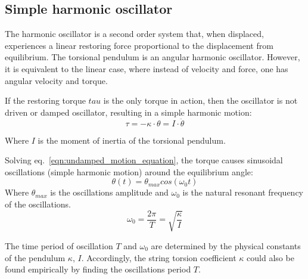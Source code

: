 \documentclass[\main/master.tex]{subfiles}
\begin{document}
\subsection{Simple harmonic oscillator}
The harmonic oscillator is a second order system that, when displaced, experiences a linear restoring force proportional to the displacement from equilibrium. The torsional pendulum is an angular harmonic oscillator. However, it is equivalent to the linear case, where instead of velocity and force, one has angular velocity and torque.
\par\noindent
If the restoring torque $tau$ is the only torque in action, then the oscillator is not driven or damped oscillator, resulting in a simple harmonic motion:
\begin{equation}
\tau = -\kappa\cdot\theta  = I\cdot\ddot{\theta}   \label{eqn:undamped_motion_equation}
\end{equation}
\par\noindent
Where $I$ is the moment of inertia of the torsional pendulum. 
\par\noindent
Solving eq.~\ref{eqn:undamped_motion_equation}, the torque causes sinusoidal oscillations (simple harmonic motion) around the equilibrium angle:  
\begin{equation}
\theta(t) = \theta_{max}cos(\omega_0 t )    \label{eqn:undamped_motion_equation_solved}
\end{equation}
Where $\theta_{max}$ is the oscillations amplitude and $\omega_0$ is the natural resonant frequency of the oscillations.
\begin{equation}
\omega_0  = \frac{2\pi}{T} = \sqrt{\frac{\kappa}{I}}   \label{eqn:undamped_omega}
\end{equation}
\par\noindent
The time period of oscillation $T$ and $\omega_0$ are determined by the physical constants of the pendulum $\kappa$, $I$. Accordingly, the string torsion coefficient $\kappa$ could also be found empirically by finding the oscillations period $T$.
\end{document}
